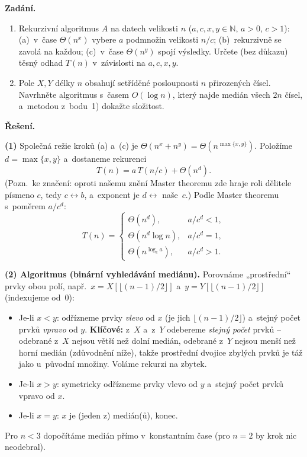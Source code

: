 \documentclass[11pt,a4paper]{article}
\begin{document}
\begin{priklad}
\par
\textbf{Zadání.}
\begin{enumerate}
  \item Rekurzivní algoritmus $A$ na datech velikosti $n$ ($a,c,x,y\in\mathbb N$, $a>0$, $c>1$): (a)~v~čase $\Theta(n^x)$ vybere $a$ podmnožin velikosti $n/c$; (b)~rekurzivně se zavolá na každou; (c)~v~čase $\Theta(n^y)$ spojí výsledky. Určete (bez důkazu) těsný odhad $T(n)$ v~závislosti na $a,c,x,y$.
  \item Pole $X,Y$ délky $n$ obsahují setříděné posloupnosti $n$ přirozených čísel. Navrhněte algoritmus s~časem $O(\log n)$, který najde medián všech $2n$ čísel, a~metodou z~bodu~1) dokažte složitost.
\end{enumerate}

\smallskip
\textbf{Řešení.}\par
\textbf{(1)} Společná režie kroků (a) a~(c) je $\Theta(n^x+n^y)=\Theta(n^{\max\{x,y\}})$. Položíme $d=\max\{x,y\}$ a~dostaneme rekurenci
\[
T(n)=a\,T(n/c)+\Theta(n^{d}).
\]
(Pozn.\ ke značení: oproti našemu znění Master theoremu zde hraje roli dělitele písmeno $c$, tedy $c\leftrightarrow b$, a~exponent je $d\leftrightarrow$ naše~$c$.) Podle Master theoremu s~poměrem $a/c^{d}$:
\[
T(n)=
\begin{cases}
\Theta(n^{d}), & a/c^{d}<1,\\
\Theta(n^{d}\log n), & a/c^{d}=1,\\
\Theta(n^{\log_c a}), & a/c^{d}>1.
\end{cases}
\]

\textbf{(2) Algoritmus (binární vyhledávání mediánu).} Porovnáme „prostřední`` prvky obou polí, např.\ $x=X[\lfloor(n-1)/2\rfloor]$ a~$y=Y[\lfloor(n-1)/2\rfloor]$ (indexujeme od~0):
\begin{itemize}
  \item Je-li $x<y$: odřízneme prvky \emph{vlevo} od $x$ (je jich $\lfloor(n-1)/2\rfloor$) a~stejný počet prvků \emph{vpravo} od $y$. \textbf{Klíčové:} z~$X$ a~z~$Y$ odebereme \emph{stejný počet} prvků -- odebrané z~$X$ nejsou větší než dolní medián, odebrané z~$Y$ nejsou menší než horní medián (zdůvodnění níže), takže prostřední dvojice zbylých prvků je táž jako u~původní množiny. Voláme rekurzi na zbytek.
  \item Je-li $x>y$: symetricky odřízneme prvky vlevo od $y$ a~stejný počet prvků vpravo od $x$.
  \item Je-li $x=y$: $x$ je (jeden z) medián(ů), konec.
\end{itemize}
Pro $n<3$ dopočítáme medián přímo v~konstantním čase (pro $n=2$ by krok nic neodebral).


\end{priklad}
\end{document}
